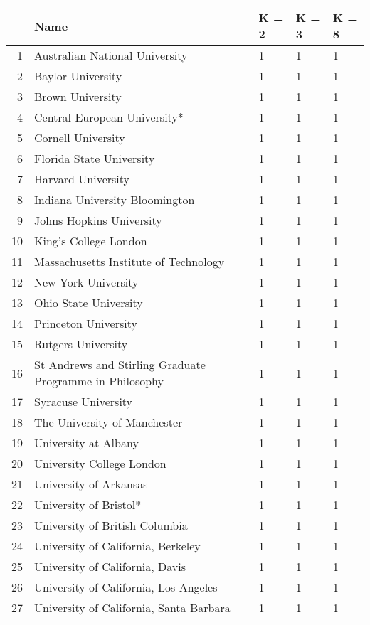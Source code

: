 \begin{longtable}{rllll}
  \hline
 & Name & K = 2 & K = 3 & K = 8 \\ 
  \hline
1 & Australian National University & 1 & 1 & 1 \\ 
  2 & Baylor University & 1 & 1 & 1 \\ 
  3 & Brown University & 1 & 1 & 1 \\ 
  4 & Central European University* & 1 & 1 & 1 \\ 
  5 & Cornell University & 1 & 1 & 1 \\ 
  6 & Florida State University & 1 & 1 & 1 \\ 
  7 & Harvard University & 1 & 1 & 1 \\ 
  8 & Indiana University Bloomington & 1 & 1 & 1 \\ 
  9 & Johns Hopkins University & 1 & 1 & 1 \\ 
  10 & King's College London & 1 & 1 & 1 \\ 
  11 & Massachusetts Institute of Technology & 1 & 1 & 1 \\ 
  12 & New York University & 1 & 1 & 1 \\ 
  13 & Ohio State University & 1 & 1 & 1 \\ 
  14 & Princeton University & 1 & 1 & 1 \\ 
  15 & Rutgers University & 1 & 1 & 1 \\ 
  16 & St Andrews and Stirling Graduate Programme in Philosophy & 1 & 1 & 1 \\ 
  17 & Syracuse University & 1 & 1 & 1 \\ 
  18 & The University of Manchester & 1 & 1 & 1 \\ 
  19 & University at Albany & 1 & 1 & 1 \\ 
  20 & University College London & 1 & 1 & 1 \\ 
  21 & University of Arkansas & 1 & 1 & 1 \\ 
  22 & University of Bristol* & 1 & 1 & 1 \\ 
  23 & University of British Columbia & 1 & 1 & 1 \\ 
  24 & University of California, Berkeley & 1 & 1 & 1 \\ 
  25 & University of California, Davis & 1 & 1 & 1 \\ 
  26 & University of California, Los Angeles & 1 & 1 & 1 \\ 
  27 & University of California, Santa Barbara & 1 & 1 & 1 \\ 

\end{longtable}
